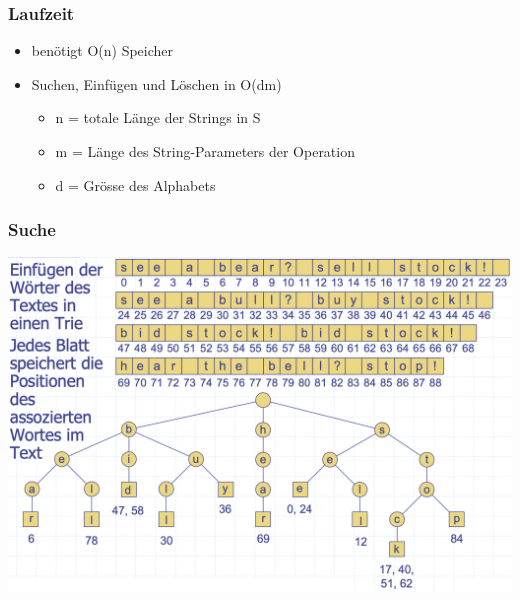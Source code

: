 \subsubsection{Laufzeit}
\begin{itemize}
    \item benötigt O(n) Speicher
    \item Suchen, Einfügen und Löschen in O(dm)
    \begin{itemize}
        \item n = totale Länge der Strings in S
        \item m = Länge des String-Parameters der Operation
        \item d = Grösse des Alphabets
    \end{itemize}
\end{itemize}
\subsubsection{Suche}
\begin{center}
    \includegraphics[scale=.25]{graphic/09 Tries/suche.png}
\end{center}
\vspace{-8pt}


